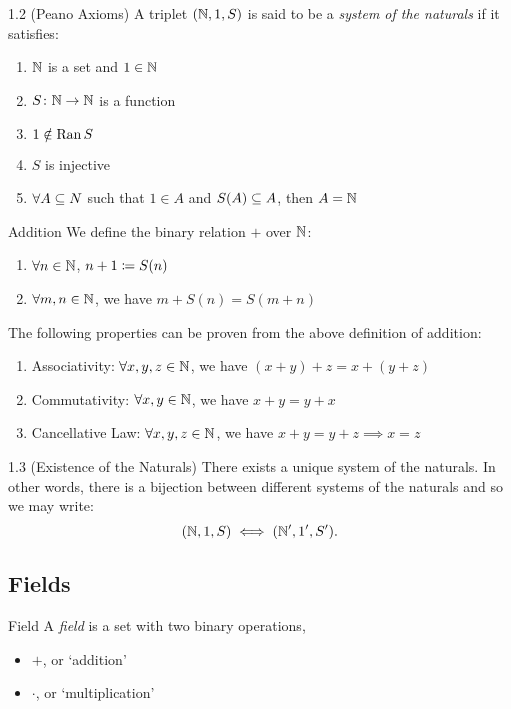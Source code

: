 \documentclass[class=article, crop=false]{standalone}
\begin{document}
  \begin{definition}{1.2 (Peano Axioms)}
    A triplet $(\mathbb{N}, 1, S)$ is said to be a \emph{system of the naturals} if it satisfies:
    \begin{enumerate}[label=\arabic*)]
      \item $\mathbb{N}$ is a set and $1\in\mathbb{N}$
      \item $S\colon \mathbb{N}\to \mathbb{N}$ is a function
      \item $1\notin \operatorname{Ran} S$
      \item $S$ is injective
      \item $\forall A\subseteq N$ such that $1\in A$ and $S(A)\subseteq A$, then $A = \mathbb{N}$
    \end{enumerate}
  \end{definition}
  \begin{definition}{Addition}
    We define the binary relation $+$ over $\mathbb{N}$:
    \begin{enumerate}[label=(\roman*)]
      \item $\forall n\in\mathbb{N}$, $n + 1\coloneqq S(n)$
      \item $\forall m, n\in \mathbb{N}$, we have $m + S(n) = S(m + n)$
    \end{enumerate}
  \end{definition}
  The following properties can be proven from the above definition of addition:
  \begin{enumerate}[label=(\alph*)]
    \item Associativity: $\forall x,y,z\in \mathbb{N}$, we have $(x + y) + z = x + (y + z)$
    \item Commutativity: $\forall x,y\in \mathbb{N}$, we have $x + y = y + x$
    \item Cancellative Law: $\forall x, y, z\in \mathbb{N}$, we have $x + y = y + z\implies x = z$
  \end{enumerate}
  \begin{theorem}{1.3 (Existence of the Naturals)}
    There exists a unique system of the naturals. In other words, there is a bijection between different systems of the naturals and so we may write:
    \[
      (\mathbb{N}, 1, S) \iff (\mathbb{N}', 1', S').
    \]
  \end{theorem}


  \subsection{Fields}
  \begin{definition}{Field}
    A \emph{field} is a set with two binary operations,
    \begin{itemize}
      \item $+$, or `addition'
      \item $\cdot$, or `multiplication'
    \end{itemize}
  \end{definition}
\end{document}
